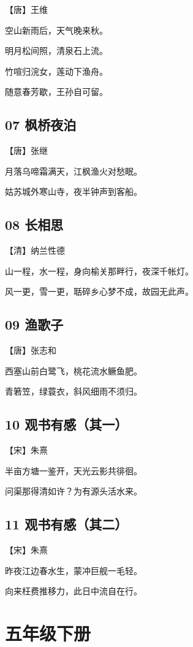 \documentclass[a6paper, 12pt]{article}
\begin{document}
【唐】王维

空山新雨后，天气晚来秋。

明月松间照，清泉石上流。

竹喧归浣女，莲动下渔舟。

随意春芳歇，王孙自可留。

\subsection*{07 枫桥夜泊}

【唐】张继

月落乌啼霜满天，江枫渔火对愁眠。

姑苏城外寒山寺，夜半钟声到客船。

\subsection*{08 长相思}

【清】纳兰性德

山一程，水一程，身向榆关那畔行，夜深千帐灯。

风一更，雪一更，聒碎乡心梦不成，故园无此声。

\subsection*{09 渔歌子}

【唐】张志和

西塞山前白鹭飞，桃花流水鳜鱼肥。

青箬笠，绿蓑衣，斜风细雨不须归。

\subsection*{10 观书有感（其一）}

【宋】朱熹

半亩方塘一鉴开，天光云影共徘徊。

问渠那得清如许？为有源头活水来。

\subsection*{11 观书有感（其二）}

【宋】朱熹

昨夜江边春水生，蒙冲巨舰一毛轻。

向来枉费推移力，此日中流自在行。

\newpage

\section*{五年级下册}
\end{document}
